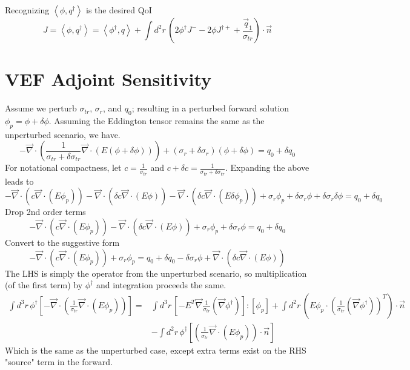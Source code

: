 \documentclass{article}
\newcommand{\bra}{\left\langle}
\newcommand{\ket}{\right\rangle}
\newcommand{\vdiv}{\vec{\nabla} \cdot}
\newcommand{\vgrad}{\vec{\nabla}}
\begin{document}
Recognizing $\bra \phi, q^\dag \ket $ is the desired QoI
\[
J = \bra \phi, q^\dag \ket = \bra \phi^\dag , q \ket + \int d^2 r \, \left( 2\phi^\dag J^- - 2\phi J^{ \dag + }   +  \frac{\vec{q}_1}{\sigma_{tr}} \right) \cdot \vec{n}
\]
\section{VEF Adjoint Sensitivity}
Assume we perturb $\sigma_{tr}$, $\sigma_r$, and $q_0$; resulting in a perturbed forward solution $\phi_p = \phi + \delta \phi$. Assuming the Eddington tensor remains the same as the unperturbed scenario, we have.
\[
-\vdiv \left( \frac{1}{\sigma_{tr}+\delta \sigma_{tr}} \vdiv \left( E \left( \phi + \delta \phi \right) \right) \right)
+ \left( \sigma_r + \delta \sigma_r \right) \left( \phi + \delta \phi \right)
= q_0 + \delta q_0
\]
For notational compactness, let $c=\frac{1}{\sigma_{tr}}$ and $c + \delta c = \frac{1}{\sigma_{tr}+\delta \sigma_{tr}}$. Expanding the above leads to 
\[ 
-\vdiv \left( c \vdiv \left( E \phi_p \right) \right) 
- \vdiv \left( \delta c \vdiv \left( E \phi \right) \right) 
- \vdiv \left( \delta c \vdiv \left( E \delta \phi_p \right) \right) 
+ \sigma_r \phi_p
+ \delta \sigma_r \phi
+ \delta \sigma_r \delta \phi
= q_0 + \delta q_0 
\]
Drop 2nd order terms
\[ 
-\vdiv \left( c \vdiv \left( E \phi_p \right) \right) 
- \vdiv \left( \delta c \vdiv \left( E \phi \right) \right) 
+ \sigma_r \phi_p
+ \delta \sigma_r \phi
= q_0 + \delta q_0 
\]
Convert to the suggestive form
\[ 
-\vdiv \left( c \vdiv \left( E \phi_p \right) \right) + \sigma_r \phi_p
= q_0 + \delta q_0 - \delta \sigma_r \phi + \vdiv \left( \delta c \vdiv \left( E \phi \right) \right) 
\]
The LHS is simply the operator from the unperturbed scenario, so multiplication (of the first term) by $\phi^\dag$ and integration proceeds the same.
\begin{align*}
\int d^3r \, \phi^\dag \left[  -\vdiv \left( \frac{1}{\sigma_{tr}} \vdiv \left( E \phi_p \right) \right) \right] 
=& \int d^3r \, \left[- E^T \vgrad \frac{1}{ \sigma_{tr}} \left(  \vgrad \phi^\dag \right) \right] : \left[ \phi_p \right] 
+ \int d^2 r \, \left( E \phi_p \cdot \left( \frac{1}{ \sigma_{tr}} \left(  \vgrad \phi^\dag \right) \right)^T \right) \cdot \vec{n} \\
&- \int d^2 r \, \phi^\dag \left[ \left( \frac{1}{\sigma_{tr}} \vdiv \left( E \phi_p \right) \right) \cdot \vec{n} \right]
\end{align*}
Which is the same as the unperturbed case, except extra terms exist on the RHS "source" term in the forward.
\end{document}
